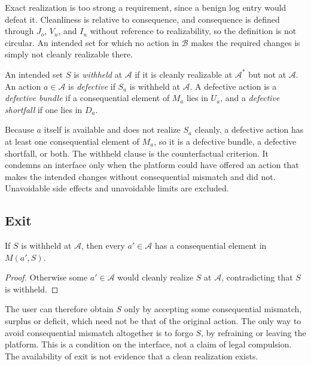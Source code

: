 \begin{remark}
Exact realization is too strong a requirement, since a benign log entry would defeat it. Cleanliness is relative to consequence, and consequence is defined through $J_o$, $V_u$, and $I_u$ without reference to realizability, so the definition is not circular. An intended set for which no action in $\mathcal{B}$ makes the required changes is simply not cleanly realizable there.
\end{remark}

\begin{definition}
An intended set $S$ is \emph{withheld} at $\mathcal{A}$ if it is cleanly realizable at $\mathcal{A}^{*}$ but not at $\mathcal{A}$. An action $a\in\mathcal{A}$ is \emph{defective} if $S_a$ is withheld at $\mathcal{A}$. A defective action is a \emph{defective bundle} if a consequential element of $M_a$ lies in $U_a$, and a \emph{defective shortfall} if one lies in $D_a$.
\end{definition}

Because $a$ itself is available and does not realize $S_a$ cleanly, a defective action has at least one consequential element of $M_a$, so it is a defective bundle, a defective shortfall, or both. The withheld clause is the counterfactual criterion. It condemns an interface only when the platform could have offered an action that makes the intended changes without consequential mismatch and did not. Unavoidable side effects and unavoidable limits are excluded.

\subsection{Exit}

\begin{proposition}
If $S$ is withheld at $\mathcal{A}$, then every $a'\in\mathcal{A}$ has a consequential element in $M(a',S)$.
\end{proposition}

\begin{proof}
Otherwise some $a'\in\mathcal{A}$ would cleanly realize $S$ at $\mathcal{A}$, contradicting that $S$ is withheld.
\end{proof}

The user can therefore obtain $S$ only by accepting some consequential mismatch, surplus or deficit, which need not be that of the original action. The only way to avoid consequential mismatch altogether is to forgo $S$, by refraining or leaving the platform. This is a condition on the interface, not a claim of legal compulsion. The availability of exit is not evidence that a clean realization exists.
